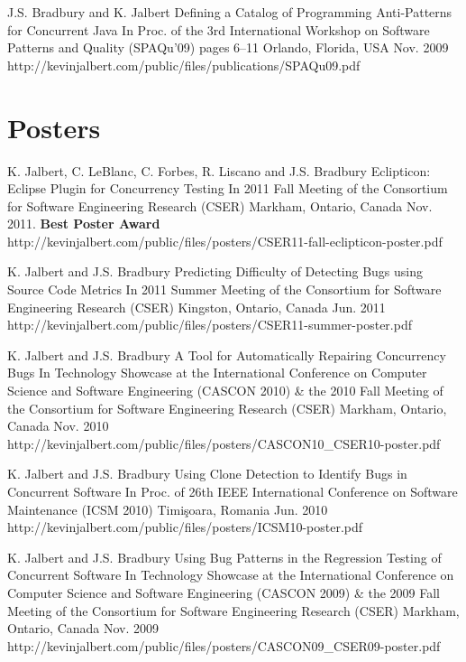   \publicationEntry
    {J.S. Bradbury and K. Jalbert}
    {Defining a Catalog of Programming Anti-Patterns for Concurrent Java}
    {In Proc. of the 3rd International Workshop on Software Patterns and Quality (SPAQu'09)}
    {pages 6--11}
    {Orlando, Florida, USA}
    {Nov. 2009}
    {http://kevinjalbert.com/public/files/publications/SPAQu09.pdf}

  \section{Posters}

  \posterEntry
    {K. Jalbert, C. LeBlanc, C. Forbes, R. Liscano and J.S. Bradbury}
    {Eclipticon: Eclipse Plugin for Concurrency Testing}
    {In 2011 Fall Meeting of the Consortium for Software Engineering Research (CSER)}
    {Markham, Ontario, Canada}
    {Nov. 2011. \textbf{Best Poster Award}}
    {http://kevinjalbert.com/public/files/posters/CSER11-fall-eclipticon-poster.pdf}

  \posterEntry
    {K. Jalbert and J.S. Bradbury}
    {Predicting Difficulty of Detecting Bugs using Source Code Metrics}
    {In 2011 Summer Meeting of the Consortium for Software Engineering Research (CSER)}
    {Kingston, Ontario, Canada}
    {Jun. 2011}
    {http://kevinjalbert.com/public/files/posters/CSER11-summer-poster.pdf}

  \posterEntry
    {K. Jalbert and J.S. Bradbury}
    {A Tool for Automatically Repairing Concurrency Bugs}
    {In Technology Showcase at the International Conference on Computer Science and Software Engineering (CASCON 2010) \& the 2010 Fall Meeting of the Consortium for Software Engineering Research (CSER)}
    {Markham, Ontario, Canada}
    {Nov. 2010}
    {http://kevinjalbert.com/public/files/posters/CASCON10_CSER10-poster.pdf}

  \posterEntry
    {K. Jalbert and J.S. Bradbury}
    {Using Clone Detection to Identify Bugs in Concurrent Software}
    {In Proc. of 26th IEEE International Conference on Software Maintenance (ICSM 2010)}
    {Timi\c{s}oara, Romania}
    {Jun. 2010}
    {http://kevinjalbert.com/public/files/posters/ICSM10-poster.pdf}

  \posterEntry
    {K. Jalbert and J.S. Bradbury}
    {Using Bug Patterns in the Regression Testing of Concurrent Software}
    {In Technology Showcase at the International Conference on Computer Science and Software Engineering (CASCON 2009) \& the 2009 Fall Meeting of the Consortium for Software Engineering Research (CSER)}
    {Markham, Ontario, Canada}
    {Nov. 2009}
    {http://kevinjalbert.com/public/files/posters/CASCON09_CSER09-poster.pdf}


